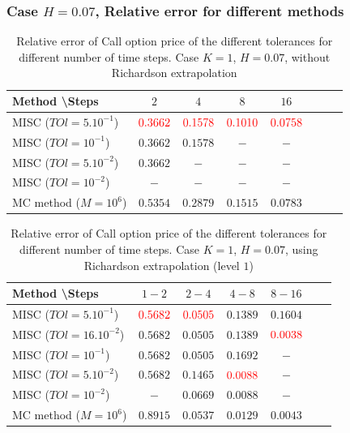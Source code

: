 \documentclass[11pt]{article}
\begin{document}
\subsubsection{Case $H=0.07$, Relative error for different methods}
\label{sec:Case $H=0.07$, Relative error for different methods}
\begin{table}[h!]
	\centering
	\begin{tabular}{l*{6}{c}r}
		Method \textbackslash  Steps            & $2$ & $4$ & $8$ & $16$ &   \\
		\hline
			MISC ($TOl=5.10^{-1}$)  & ${\color{red}0.3662}$ & ${\color{red}0.1578}$ & ${\color{red}0.1010}$ & ${\color{red}0.0758}$  \\
		MISC ($TOl=10^{-1}$)  & $0.3662$ &  $0.1578$ & $-$ & $-$  \\
		MISC ($TOl=5.10^{-2}$)        & $0.3662$ &$-$ &  $-$ &  $-$ \\
		MISC ($TOl=10^{-2}$)    & $-$ & $-$  & $-$ & $-$  \\	
		MC method ($M=10^{6}$)   & $\mathbf{0.5354}$  & $\mathbf{0.2879}$  & $\mathbf{0.1515}$ & $\mathbf{0.0783}$  \\	
		\hline
	\end{tabular}
	\caption{Relative error of Call option price of the different tolerances for different number of time steps. Case $K=1$, $H=0.07$, without Richardson extrapolation}
	\label{Relative error of Call option price of the different tolerances for different number of time steps. Case $K=1, H=0.07$}
\end{table}





\begin{table}[h!]
	\centering
	\begin{tabular}{l*{5}{c}r}
		Method \textbackslash  Steps &$1-2$             & $2-4$ & $4-8$ & $8-16$ \\
		\hline
		MISC ($TOl=5.10^{-1}$)  &${\color{red}0.5682}$ & ${\color{red}0.0505}$ & $0.1389$ & $0.1604$ \\
		MISC ($TOl=16.10^{-2}$)  &$0.5682$ & $0.0505$ & $0.1389$ & ${\color{red}0.0038}$  \\
		MISC ($TOl=10^{-1}$)  &$0.5682$ &  $0.0505$ & $ 0.1692$ & $-$ \\
		MISC ($TOl=5.10^{-2}$) &$0.5682$ &  $ 0.1465$ & ${\color{red}0.0088}$ & $-$   \\
		MISC ($TOl=10^{-2}$)&$-$ &  $0.0669$ & $0.0088$ & $-$ \\	
			MC method ($M=10^{6}$)  &$\mathbf{0.8915}$  & $\mathbf{0.0537}$  & $\mathbf{0.0129}$  & $\mathbf{0.0043}$ \\
		\hline	
	
	\end{tabular}
	\caption{Relative error of Call option price of the different tolerances for different number of time steps. Case $K=1$, $H=0.07$, using Richardson extrapolation (level $1$)}
	\label{Relative error of Call option price of the different tolerances for different number of time steps. Case $K=1, H=0.07$ , using Richardson extrapolation}
\end{table}
\end{document}
